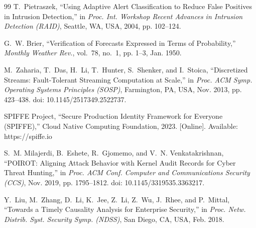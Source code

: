 \documentclass[conference]{IEEEtran}
\begin{document}
\begin{thebibliography}{99}
T.~Pietraszek, ``Using Adaptive Alert Classification to Reduce False Positives
in Intrusion Detection,'' in \textit{Proc. Int. Workshop Recent Advances in
Intrusion Detection (RAID)}, Seattle, WA, USA, 2004, pp. 102--124.

G.~W. Brier, ``Verification of Forecasts Expressed in Terms of Probability,''
\textit{Monthly Weather Rev.}, vol.~78, no.~1, pp. 1--3, Jan. 1950.

M.~Zaharia, T.~Das, H.~Li, T.~Hunter, S.~Shenker, and I.~Stoica, ``Discretized
Streams: Fault-Tolerant Streaming Computation at Scale,'' in \textit{Proc. ACM
Symp. Operating Systems Principles (SOSP)}, Farmington, PA, USA, Nov. 2013,
pp. 423--438. doi: 10.1145/2517349.2522737.

SPIFFE Project, ``Secure Production Identity Framework for Everyone (SPIFFE),''
Cloud Native Computing Foundation, 2023. [Online]. Available: https://spiffe.io

S.~M. Milajerdi, B.~Eshete, R.~Gjomemo, and V.~N. Venkatakrishnan, ``POIROT:
Aligning Attack Behavior with Kernel Audit Records for Cyber Threat Hunting,''
in \textit{Proc. ACM Conf. Computer and Communications Security (CCS)}, Nov.
2019, pp. 1795--1812. doi: 10.1145/3319535.3363217.

Y.~Liu, M.~Zhang, D.~Li, K.~Jee, Z.~Li, Z.~Wu, J.~Rhee, and P.~Mittal,
``Towards a Timely Causality Analysis for Enterprise Security,'' in \textit{Proc.
Netw. Distrib. Syst. Security Symp. (NDSS)}, San Diego, CA, USA, Feb. 2018.

\end{thebibliography}

\balance
\end{document}
